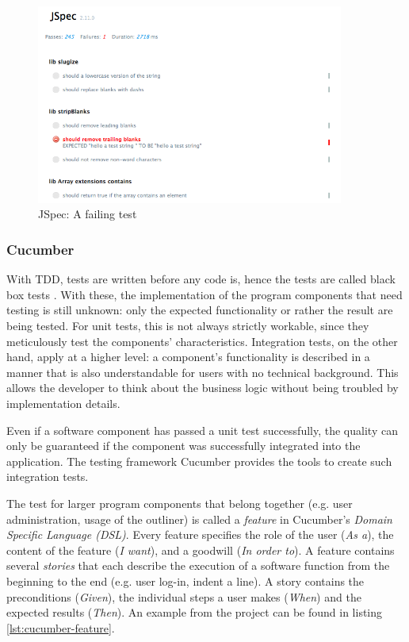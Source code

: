 \medskip
\begin{figure}[ht] 
  \begin{center}
    \includegraphics[width=0.9\textwidth]{grafik/jspec-example-bad} 
  \end{center}
  \caption{JSpec: A failing test}
  \label{fig:jspec-bad} 
\end{figure}



\subsubsection{Cucumber}
\label{subsec:cucumber}

With TDD, tests are written before any code is, hence the tests are called black box tests \cite{beck:tdd}. With these, the implementation of the program components that need testing is still unknown: only the expected functionality or rather the result are being tested. For unit tests, this is not always strictly workable, since they meticulously test the components' characteristics. Integration tests, on the other hand, apply at a higher level: a component's functionality is described in a manner that is also understandable for users with no technical background. This allows the developer to think about the business logic without being troubled by implementation details.

Even if a software component has passed a unit test successfully, the quality can only be guaranteed if the component was successfully integrated into the application. The testing framework Cucumber \cite{cucumber:website} provides the tools to create such integration tests.

The test for larger program components that belong together (e.g. user administration, usage of the outliner) is called a \textit{feature} in Cucumber's \textit{Domain Specific Language (DSL)}. Every feature specifies the role of the user (\textit{As a}), the content of the feature (\textit{I want}), and a goodwill (\textit{In order to}). A feature contains several \textit{stories} that each describe the execution of a software function from the beginning to the end (e.g. user log-in, indent a line). A story contains the preconditions (\textit{Given}), the individual steps a user makes (\textit{When}) and the expected results (\textit{Then}). An example from the project can be found in listing \ref{lst:cucumber-feature}.

